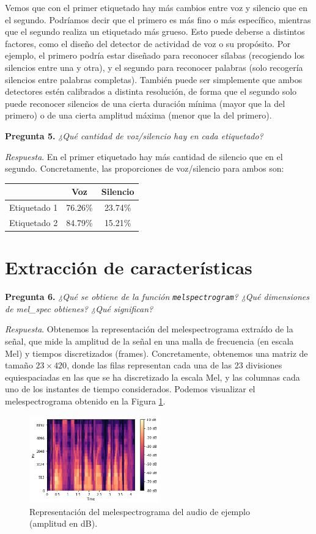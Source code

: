 \documentclass[11pt]{article}
\begin{document}
Vemos que con el primer etiquetado hay más cambios entre voz y silencio que en el segundo. Podríamos decir que el primero es más fino o más específico, mientras que el segundo realiza un etiquetado más grueso. Esto puede deberse a distintos factores, como el diseño del detector de actividad de voz o su propósito. Por ejemplo, el primero podría estar diseñado para reconocer sílabas (recogiendo los silencios entre una y otra), y el segundo para reconocer palabras (solo recogería silencios entre palabras completas). También puede ser simplemente que ambos detectores estén calibrados a distinta resolución, de forma que el segundo solo puede reconocer silencios de una cierta duración mínima (mayor que la del primero) o de una cierta amplitud máxima (menor que la del primero).

\textbf{Pregunta 5.} \textit{¿Qué cantidad de voz/silencio hay en cada etiquetado?}

\textit{Respuesta}. En el primer etiquetado hay más cantidad de silencio que en el segundo. Concretamente, las proporciones de voz/silencio para ambos son:

\begin{table}[h!]
  \centering
  \begin{tabular}{c|cc}
    & Voz & Silencio\\
    \hline
    Etiquetado 1 & 76.26\%&23.74\%\\
    Etiquetado 2 & 84.79\%&15.21\%
  \end{tabular}
\end{table}

\section{Extracción de características}

\textbf{Pregunta 6.} \textit{¿Qué se obtiene de la función \texttt{melspectrogram}? ¿Qué dimensiones de mel\_spec obtienes? ¿Qué significan?}

\textit{Respuesta}. Obtenemos la representación del melespectrograma extraído de la señal, que mide la amplitud de la señal en una malla de frecuencia (en escala Mel) y tiempos discretizados (frames). Concretamente, obtenemos una matriz de tamaño $23\times 420$, donde las filas representan cada una de las 23 divisiones equiespaciadas en las que se ha discretizado la escala Mel, y las columnas cada uno de los instantes de tiempo considerados. Podemos visualizar el melespectrograma obtenido en la Figura \ref{fig:1_mel}.
\begin{figure}[h!]
  \centering
  \includegraphics[width=0.5\textwidth]{img/1_mel}
  \caption{Representación del melespectrograma del audio de ejemplo (amplitud en dB).}
  \label{fig:1_mel}
\end{figure}
\end{document}
